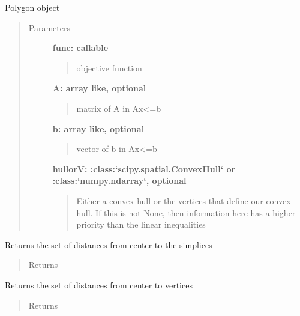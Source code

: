 \documentclass[letterpaper,10pt,english]{sphinxmanual}
\begin{document}
\begin{fulllineitems}
Polygon object
\begin{quote}\begin{description}
\item[{Parameters}] \leavevmode
\textbf{func: callable}
\begin{quote}

objective function
\end{quote}

\textbf{A: array like, optional}
\begin{quote}

matrix of A in Ax\textless{}=b
\end{quote}

\textbf{b: array like, optional}
\begin{quote}

vector of b in Ax\textless{}=b
\end{quote}

\textbf{hullorV: :class:{}`scipy.spatial.ConvexHull{}` or :class:{}`numpy.ndarray{}`, optional}
\begin{quote}

Either a convex hull or the vertices that define our convex hull.  If this
is not None, then information here has a higher priority than the linear 
inequalities
\end{quote}

\end{description}\end{quote}


\begin{fulllineitems}
Returns the set of distances from center to the simplices
\begin{quote}\begin{description}
\item[{Returns}] \leavevmode
\href{http://docs.scipy.org/doc/numpy/reference/generated/numpy.ndarray.html\#numpy.ndarray}{}

\end{description}\end{quote}

\end{fulllineitems}



\begin{fulllineitems}
Returns the set of distances from center to vertices
\begin{quote}\begin{description}
\item[{Returns}] \leavevmode
\href{http://docs.scipy.org/doc/numpy/reference/generated/numpy.ndarray.html\#numpy.ndarray}{}


\end{description}
\end{quote}
\end{fulllineitems}
\end{fulllineitems}
\end{document}
